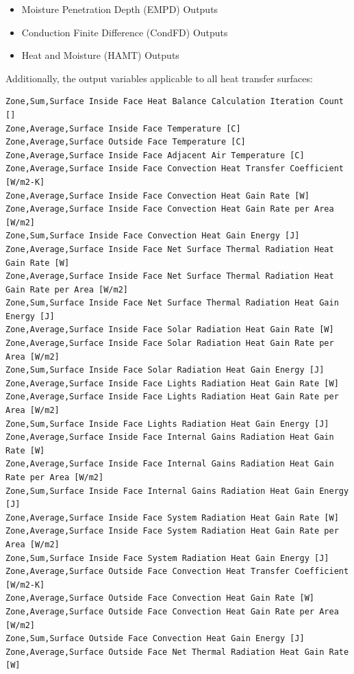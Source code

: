 \begin{itemize}
\tightlist
\item
  Moisture Penetration Depth (EMPD) Outputs
\item
  Conduction Finite Difference (CondFD) Outputs
\item
  Heat and Moisture (HAMT) Outputs
\end{itemize}

Additionally, the output variables applicable to all heat transfer surfaces:

\begin{lstlisting}
Zone,Sum,Surface Inside Face Heat Balance Calculation Iteration Count []
Zone,Average,Surface Inside Face Temperature [C]
Zone,Average,Surface Outside Face Temperature [C]
Zone,Average,Surface Inside Face Adjacent Air Temperature [C]
Zone,Average,Surface Inside Face Convection Heat Transfer Coefficient [W/m2-K]
Zone,Average,Surface Inside Face Convection Heat Gain Rate [W]
Zone,Average,Surface Inside Face Convection Heat Gain Rate per Area [W/m2]
Zone,Sum,Surface Inside Face Convection Heat Gain Energy [J]
Zone,Average,Surface Inside Face Net Surface Thermal Radiation Heat Gain Rate [W]
Zone,Average,Surface Inside Face Net Surface Thermal Radiation Heat Gain Rate per Area [W/m2]
Zone,Sum,Surface Inside Face Net Surface Thermal Radiation Heat Gain Energy [J]
Zone,Average,Surface Inside Face Solar Radiation Heat Gain Rate [W]
Zone,Average,Surface Inside Face Solar Radiation Heat Gain Rate per Area [W/m2]
Zone,Sum,Surface Inside Face Solar Radiation Heat Gain Energy [J]
Zone,Average,Surface Inside Face Lights Radiation Heat Gain Rate [W]
Zone,Average,Surface Inside Face Lights Radiation Heat Gain Rate per Area [W/m2]
Zone,Sum,Surface Inside Face Lights Radiation Heat Gain Energy [J]
Zone,Average,Surface Inside Face Internal Gains Radiation Heat Gain Rate [W]
Zone,Average,Surface Inside Face Internal Gains Radiation Heat Gain Rate per Area [W/m2]
Zone,Sum,Surface Inside Face Internal Gains Radiation Heat Gain Energy [J]
Zone,Average,Surface Inside Face System Radiation Heat Gain Rate [W]
Zone,Average,Surface Inside Face System Radiation Heat Gain Rate per Area [W/m2]
Zone,Sum,Surface Inside Face System Radiation Heat Gain Energy [J]
Zone,Average,Surface Outside Face Convection Heat Transfer Coefficient [W/m2-K]
Zone,Average,Surface Outside Face Convection Heat Gain Rate [W]
Zone,Average,Surface Outside Face Convection Heat Gain Rate per Area [W/m2]
Zone,Sum,Surface Outside Face Convection Heat Gain Energy [J]
Zone,Average,Surface Outside Face Net Thermal Radiation Heat Gain Rate [W]

\end{lstlisting}
